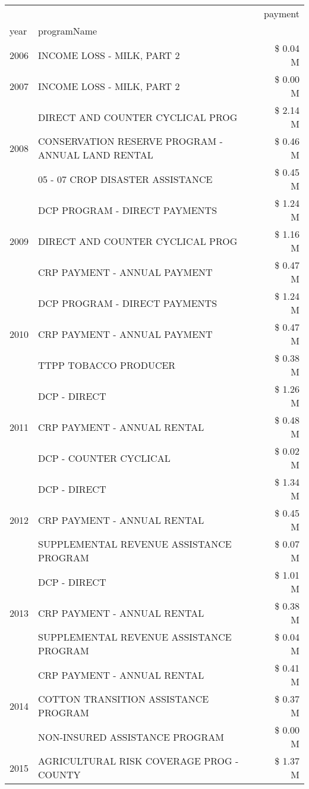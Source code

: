 \begin{tabular}{llr}
\toprule
 &  & payment \\
year & programName &  \\
\midrule
2006 & INCOME LOSS - MILK, PART 2 & \$ 0.04 M \\
\cline{1-3}
2007 & INCOME LOSS - MILK, PART 2 & \$ 0.00 M \\
\cline{1-3}
\multirow[t]{3}{*}{2008} & DIRECT AND COUNTER CYCLICAL PROG & \$ 2.14 M \\
 & CONSERVATION RESERVE PROGRAM - ANNUAL LAND RENTAL & \$ 0.46 M \\
 & 05 - 07 CROP DISASTER ASSISTANCE & \$ 0.45 M \\
\cline{1-3}
\multirow[t]{3}{*}{2009} & DCP PROGRAM - DIRECT PAYMENTS & \$ 1.24 M \\
 & DIRECT AND COUNTER CYCLICAL PROG & \$ 1.16 M \\
 & CRP PAYMENT - ANNUAL PAYMENT & \$ 0.47 M \\
\cline{1-3}
\multirow[t]{3}{*}{2010} & DCP PROGRAM - DIRECT PAYMENTS & \$ 1.24 M \\
 & CRP PAYMENT - ANNUAL PAYMENT & \$ 0.47 M \\
 & TTPP TOBACCO PRODUCER & \$ 0.38 M \\
\cline{1-3}
\multirow[t]{3}{*}{2011} & DCP - DIRECT & \$ 1.26 M \\
 & CRP PAYMENT - ANNUAL RENTAL & \$ 0.48 M \\
 & DCP - COUNTER CYCLICAL & \$ 0.02 M \\
\cline{1-3}
\multirow[t]{3}{*}{2012} & DCP - DIRECT & \$ 1.34 M \\
 & CRP PAYMENT - ANNUAL RENTAL & \$ 0.45 M \\
 & SUPPLEMENTAL REVENUE ASSISTANCE PROGRAM & \$ 0.07 M \\
\cline{1-3}
\multirow[t]{3}{*}{2013} & DCP - DIRECT & \$ 1.01 M \\
 & CRP PAYMENT - ANNUAL RENTAL & \$ 0.38 M \\
 & SUPPLEMENTAL REVENUE ASSISTANCE PROGRAM & \$ 0.04 M \\
\cline{1-3}
\multirow[t]{3}{*}{2014} & CRP PAYMENT - ANNUAL RENTAL & \$ 0.41 M \\
 & COTTON TRANSITION ASSISTANCE PROGRAM & \$ 0.37 M \\
 & NON-INSURED ASSISTANCE PROGRAM & \$ 0.00 M \\
\cline{1-3}
\multirow[t]{3}{*}{2015} & AGRICULTURAL RISK COVERAGE PROG - COUNTY & \$ 1.37 M \\

\end{tabular}
